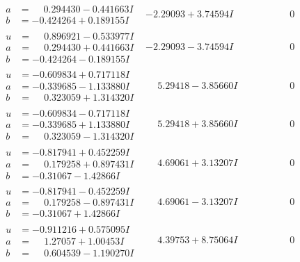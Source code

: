 \documentclass[1p]{elsarticle_modified}
\theoremstyle{definition}
\begin{document}
$$\begin{array}{c|c|c}
\begin{aligned}
a &= \phantom{-}0.294430 - 0.441663 I \\
b &= -0.424264 + 0.189155 I\end{aligned}
 & -2.29093 + 3.74594 I & \phantom{-0.000000 } 0 \\ \hline\begin{aligned}
u &= \phantom{-}0.896921 - 0.533977 I \\
a &= \phantom{-}0.294430 + 0.441663 I \\
b &= -0.424264 - 0.189155 I\end{aligned}
 & -2.29093 - 3.74594 I & \phantom{-0.000000 } 0 \\ \hline\begin{aligned}
u &= -0.609834 + 0.717118 I \\
a &= -0.339685 - 1.133880 I \\
b &= \phantom{-}0.323059 + 1.314320 I\end{aligned}
 & \phantom{-}5.29418 - 3.85660 I & \phantom{-0.000000 } 0 \\ \hline\begin{aligned}
u &= -0.609834 - 0.717118 I \\
a &= -0.339685 + 1.133880 I \\
b &= \phantom{-}0.323059 - 1.314320 I\end{aligned}
 & \phantom{-}5.29418 + 3.85660 I & \phantom{-0.000000 } 0 \\ \hline\begin{aligned}
u &= -0.817941 + 0.452259 I \\
a &= \phantom{-}0.179258 + 0.897431 I \\
b &= -0.31067 - 1.42866 I\end{aligned}
 & \phantom{-}4.69061 + 3.13207 I & \phantom{-0.000000 } 0 \\ \hline\begin{aligned}
u &= -0.817941 - 0.452259 I \\
a &= \phantom{-}0.179258 - 0.897431 I \\
b &= -0.31067 + 1.42866 I\end{aligned}
 & \phantom{-}4.69061 - 3.13207 I & \phantom{-0.000000 } 0 \\ \hline\begin{aligned}
u &= -0.911216 + 0.575095 I \\
a &= \phantom{-}1.27057 + 1.00453 I \\
b &= \phantom{-}0.604539 - 1.190270 I\end{aligned}
 & \phantom{-}4.39753 + 8.75064 I & \phantom{-0.000000 } 0 \\ \hline\begin{aligned}

\end{aligned}
\end{array}$$
\end{document}
